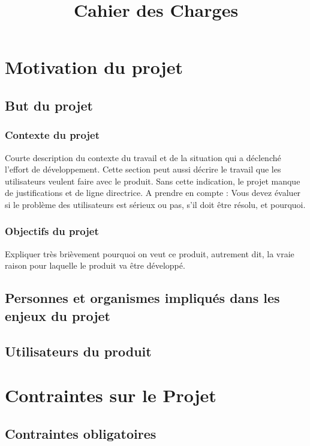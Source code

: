 
\title{\textbf{\Huge Cahier des Charges}\vspace{-4ex}}


\maketitle
\tableofcontents

	\section{Motivation du projet}
	\subsection{But du projet}
		\subsubsection{Contexte du projet}
		Courte description du contexte du travail et de la situation qui a déclenché l’effort de
développement. Cette section peut aussi décrire le travail que les utilisateurs veulent faire
avec le produit.
Sans cette indication, le projet manque de justifications et de ligne directrice. \newline
A prendre en compte :
Vous devez évaluer si le problème des utilisateurs est sérieux ou pas, s’il doit être résolu, et
pourquoi.
		\subsubsection{Objectifs du projet}
		Expliquer très brièvement pourquoi on veut ce produit, autrement dit, la vraie raison pour
laquelle le produit va être développé.
		\subsection{Personnes et organismes impliqués dans les enjeux du projet}
		\subsection{Utilisateurs du produit}
	\section{Contraintes sur le Projet}
	
		\subsection{Contraintes obligatoires}
		
